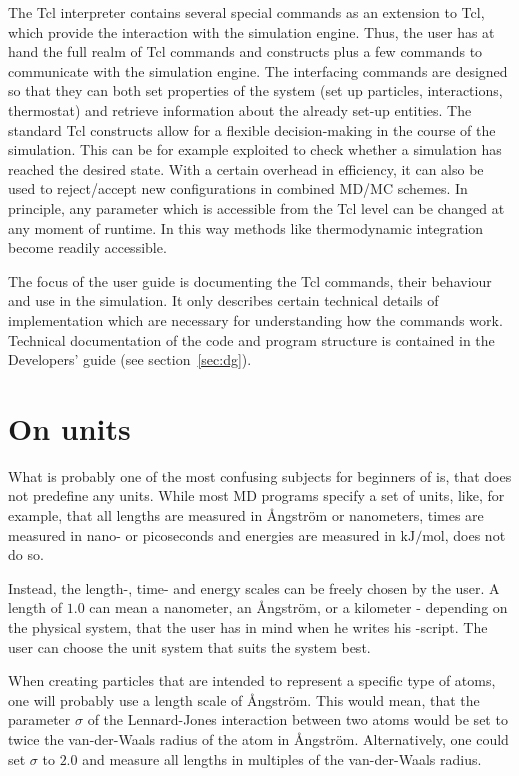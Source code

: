 The Tcl interpreter contains several special commands as an extension
to Tcl, which provide the interaction with the simulation
engine. Thus, the user has at hand the full realm of Tcl commands and
constructs plus a few commands to communicate with the simulation
engine. The interfacing commands are designed so that they can both
set properties of the system (set up particles, interactions,
thermostat) and retrieve information about the already set-up
entities. The standard Tcl constructs allow for a flexible
decision-making in the course of the simulation. This can be for
example exploited to check whether a simulation has reached the
desired state.  With a certain overhead in efficiency, it can also be
used to reject/accept new configurations in combined MD/MC schemes. In
principle, any parameter which is accessible from the Tcl level can be
changed at any moment of runtime.  In this way methods like
thermodynamic integration become readily accessible.

The focus of the user guide is documenting the Tcl commands, their
behaviour and use in the simulation. It only describes certain
technical details of implementation which are necessary for
understanding how the commands work.  Technical documentation of the
code and program structure is contained in the Developers' guide (see
section~\ref{sec:dg}).

\section{On units}
\label{sec:units}

What is probably one of the most confusing subjects for beginners of
\es is, that \es does not predefine any units.  While most MD programs
specify a set of units, like, for example, that all lengths are
measured in \AA ngstr\"om or nanometers, times are measured in nano-
or picoseconds and energies are measured in $\mathrm{kJ/mol}$, \es
does not do so.

Instead, the length-, time- and energy scales can be freely chosen by
the user.  A length of $1.0$ can mean a nanometer, an \AA ngstr\"om,
or a kilometer - depending on the physical system, that the user has
in mind when he writes his \es-script.  The user can choose the unit
system that suits the system best.

When creating particles that are intended to represent a specific type
of atoms, one will probably use a length scale of \AA ngstr\"om.  This
would mean, that \eg the parameter $\sigma$ of the Lennard-Jones
interaction between two atoms would be set to twice the van-der-Waals
radius of the atom in \AA ngstr\"om.  Alternatively, one could set
$\sigma$ to $2.0$ and measure all lengths in multiples of the
van-der-Waals radius.

